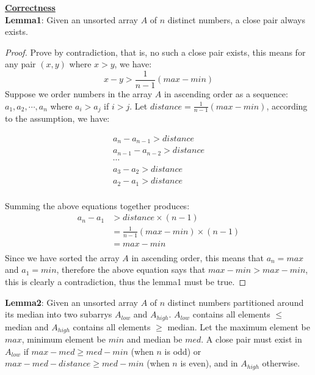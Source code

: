 \documentclass[11pt]{article}
\begin{document}
\begin{enumerate}
  \underline{\textbf{Correctness}}\\
  \textbf{Lemma1}: Given an unsorted array $A$ of $n$ distinct numbers, a
  close pair always exists.

  \begin{proof}
    Prove by contradiction, that is, no such a close pair exists, this
    means for any pair $(x,y)$ where $x > y$, we have:
    \begin{equation}
      x - y > \frac{1}{n-1} (max - min)
    \end{equation}
    Suppose we order numbers in the array $A$ in ascending order as a
    sequence: $a_1, a_2, \cdots, a_n$ where $a_i > a_j$ if $i >
    j$. Let $distance = \frac{1}{n-1} (max - min)$, according to the
    assumption, we have:

    \begin{equation}
      \begin{split}
      a_n - a_{n-1} > distance\\
      a_{n-1} - a_{n-2} > distance\\
      \cdots\\
      a_3 - a_2 > distance\\
      a_2 - a_1 > distance\\
      \end{split}
    \end{equation}

    Summing the above equations together produces:
    \begin{equation}
      \begin{split}
        a_n - a_1 &> distance \times (n-1)\\
        & = \frac{1}{n-1} (max - min) \times (n-1)\\
        & = max - min\\
      \end{split}
    \end{equation}
    Since we have sorted the array $A$ in ascending order, this means
    that $a_n = max$ and $a_1 = min$, therefore the above equation says that
    $max - min > max - min$, this is clearly a contradiction, thus the lemma1
    must be true.
  \end{proof}

  \textbf{Lemma2}: Given an unsorted array $A$ of $n$ distinct
  numbers partitioned around its median into two subarrys $A_{low}$ and
  $A_{high}$. $A_{low}$ contains all elements $\leq$ median and
  $A_{high}$ contains all elements $\geq$ median. 
  Let the maximum element be $max$, minimum element be $min$ and median
  be $med$. A close pair must exist in $A_{low}$ if $max-med \geq
  med-min$ (when $n$ is odd) or $max-med-distance \geq med-min$ (when $n$ is
  even), and in $A_{high}$ otherwise. 


\end{enumerate}
\end{document}
